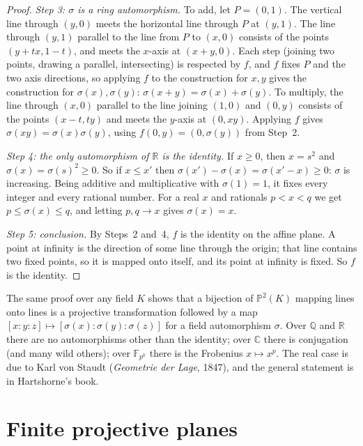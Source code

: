 \begin{proof}
\emph{Step 3: $\sigma$ is a ring automorphism.} To add, let $P=(0,1)$. The vertical line through $(y,0)$ meets the horizontal line through $P$ at
$(y,1)$. The line through $(y,1)$ parallel to the line from $P$ to $(x,0)$ consists of the points $(y+tx,1-t)$, and meets the $x$-axis at
$(x+y,0)$. Each step (joining two points, drawing a parallel, intersecting) is respected by $f$, and $f$ fixes $P$ and the two axis directions,
so applying $f$ to the construction for $x,y$ gives the construction for $\sigma(x),\sigma(y)$: $\sigma(x+y)=\sigma(x)+\sigma(y)$. To multiply,
the line through $(x,0)$ parallel to the line joining $(1,0)$ and $(0,y)$ consists of the points $(x-t,ty)$ and meets the $y$-axis at $(0,xy)$.
Applying $f$ gives $\sigma(xy)=\sigma(x)\sigma(y)$, using $f(0,y)=(0,\sigma(y))$ from Step~2.

\emph{Step 4: the only automorphism of $\mathbb R$ is the identity.} If $x\ge0$, then $x=s^2$ and $\sigma(x)=\sigma(s)^2\ge0$. So if $x\le x'$ then
$\sigma(x')-\sigma(x)=\sigma(x'-x)\ge0$: $\sigma$ is increasing. Being additive and multiplicative with $\sigma(1)=1$, it fixes every integer and
every rational number. For a real $x$ and rationals $p<x<q$ we get $p\le\sigma(x)\le q$, and letting $p,q\to x$ gives $\sigma(x)=x$.

\emph{Step 5: conclusion.} By Steps~2 and~4, $f$ is the identity on the affine plane. A point at infinity is the direction of some line through
the origin; that line contains two fixed points, so it is mapped onto itself, and its point at infinity is fixed. So $f$ is the identity.
\end{proof}

\begin{remark}
The same proof over any field $K$ shows that a bijection of $\mathbb P^2(K)$ mapping lines onto lines is a projective transformation followed by
a map $[x:y:z]\mapsto[\sigma(x):\sigma(y):\sigma(z)]$ for a field automorphism $\sigma$. Over $\mathbb Q$ and $\mathbb R$ there are no
automorphisms other than the identity; over $\mathbb C$ there is conjugation (and many wild others); over $\mathbb F_{p^k}$ there is the Frobenius
$x\mapsto x^p$. The real case is due to Karl von Staudt (\emph{Geometrie der Lage}, 1847), and the general statement is in Hartshorne's book.
\end{remark}

\section{Finite projective planes}\label{sec:finiteplanes}

